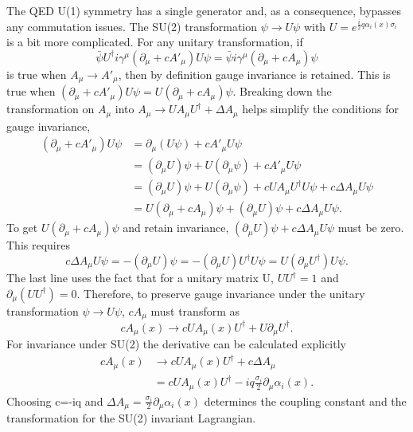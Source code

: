 \documentclass[12pt]{article}
\begin{document}
The QED U(1) symmetry has a single generator and, as a consequence, bypasses any commutation issues. The SU(2) transformation $\psi \rightarrow U\psi$ with $U = e^{\frac{i}{2}q\alpha_i(x)\sigma_i}$ is a bit more complicated. For any unitary transformation, if 
\begin{equation}
\bar{\psi}U^\dagger i\gamma^\mu\left(\partial_\mu + cA'_{\mu}\right)U\psi = \bar{\psi}i\gamma^\mu\left(\partial_\mu + cA_{\mu}\right)\psi 
\end{equation}
is true when $A_\mu \rightarrow A'_\mu$, then by definition gauge invariance is retained. This is true when $\left(\partial_\mu + cA'_{\mu}\right)U\psi =U\left(\partial_\mu + cA_{\mu}\right)\psi$. Breaking down the transformation on $A_{\mu}$ into $A_\mu \rightarrow UA_\mu U^\dagger + \Delta A_{\mu}$ helps simplify the conditions for gauge invariance, 
\begin{equation}
\begin{split}
\left(\partial_\mu + cA'_{\mu}\right)U\psi &=  \partial_\mu(U\psi) + cA'_{\mu}U\psi \\
& = (\partial_\mu U)\psi + U(\partial_\mu\psi) + cA'_{\mu}U\psi \\ 
& = (\partial_\mu U)\psi + U(\partial_\mu\psi) + cUA_{\mu}U^\dagger U\psi + c\Delta A_{\mu}U\psi \\
& = U\left(\partial_\mu + cA_{\mu}\right)\psi + (\partial_\mu U)\psi + c\Delta A_{\mu}U\psi.
\end{split}
\end{equation}
To get $U\left(\partial_\mu + cA_{\mu}\right)\psi$ and retain invariance, $(\partial_\mu U)\psi + c\Delta A_{\mu}U\psi$ must be zero. This requires 
\begin{equation}
c\Delta A_{\mu}U\psi = -(\partial_\mu U)\psi = - (\partial_\mu U)U^\dagger U\psi = U(\partial_\mu U^\dagger) U\psi.
\end{equation}
The last line uses the fact that for a unitary matrix U, $UU^\dagger = 1$ and $\partial_\mu(UU^\dagger) = 0$. Therefore, to preserve gauge invariance under the unitary transformation $\psi \rightarrow U\psi$, $cA_\mu$ must transform as
\begin{equation}
cA_\mu(x) \rightarrow cUA_\mu(x)U^\dagger + U\partial_\mu U^\dagger .
\end{equation}
For invariance under SU(2) the derivative can be calculated explicitly
\begin{equation}
\begin{split}
cA_\mu(x) &\rightarrow cUA_\mu(x)U^\dagger + c\Delta A_\mu \\ 
&= cUA_\mu(x)U^\dagger - iq\frac{\sigma_i}{2}\partial_\mu\alpha_i(x).
\end{split}
\end{equation}
Choosing c=-iq and $\Delta A_\mu = \frac{\sigma_i}{2}\partial_\mu\alpha_i(x)$ determines the coupling constant and the transformation for the SU(2) invariant Lagrangian.
\end{document}
